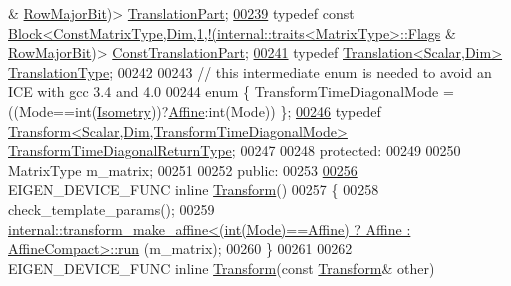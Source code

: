 \begin{DoxyCode}
       & \hyperlink{group__flags_gae4f56c2a60bbe4bd2e44c5b19cbe8762}{RowMajorBit})> \hyperlink{group___core___module_class_eigen_1_1_block}{TranslationPart};
\hyperlink{group___geometry___module_a3eab3259d3fac8106eb3139bc96ba852}{00239}   \textcolor{keyword}{typedef} \textcolor{keyword}{const} 
      \hyperlink{group___core___module_class_eigen_1_1_block}{Block<ConstMatrixType,Dim,1,!(internal::traits<MatrixType>::Flags}
       & \hyperlink{group__flags_gae4f56c2a60bbe4bd2e44c5b19cbe8762}{RowMajorBit})> \hyperlink{group___core___module_class_eigen_1_1_block}{ConstTranslationPart};
\hyperlink{group___geometry___module_a6b463d14d8be4c0eda2eed6e943b831f}{00241}   \textcolor{keyword}{typedef} \hyperlink{group___geometry___module_class_eigen_1_1_translation}{Translation<Scalar,Dim>} \hyperlink{group___geometry___module_a6b463d14d8be4c0eda2eed6e943b831f}{TranslationType};
00242   
00243   \textcolor{comment}{// this intermediate enum is needed to avoid an ICE with gcc 3.4 and 4.0}
00244   \textcolor{keyword}{enum} \{ TransformTimeDiagonalMode = ((Mode==int(\hyperlink{group__enums_ggaee59a86102f150923b0cac6d4ff05107a080cd5366173608f701cd945c2335568}{Isometry}))?\hyperlink{group__enums_ggaee59a86102f150923b0cac6d4ff05107a71e768e0581725d919d0b05f4cb83234}{Affine}:\textcolor{keywordtype}{int}(Mode)) \};
\hyperlink{group___geometry___module_a51af5e8d8d9d9bfec091ff8aa5b7845a}{00246}   \textcolor{keyword}{typedef} \hyperlink{group___geometry___module_class_eigen_1_1_transform}{Transform<Scalar,Dim,TransformTimeDiagonalMode>} 
      \hyperlink{group___geometry___module_a51af5e8d8d9d9bfec091ff8aa5b7845a}{TransformTimeDiagonalReturnType};
00247 
00248 \textcolor{keyword}{protected}:
00249 
00250   MatrixType m\_matrix;
00251 
00252 \textcolor{keyword}{public}:
00253 
\hyperlink{group___geometry___module_a79b94ccee0f7871610fa2fa084e0fd59}{00256}   EIGEN\_DEVICE\_FUNC \textcolor{keyword}{inline} \hyperlink{group___geometry___module_a79b94ccee0f7871610fa2fa084e0fd59}{Transform}()
00257   \{
00258     check\_template\_params();
00259     
      \hyperlink{struct_eigen_1_1internal_1_1transform__make__affine}{internal::transform\_make\_affine<(int(Mode)==Affine) ? Affine : AffineCompact>::run}
      (m\_matrix);
00260   \}
00261 
00262   EIGEN\_DEVICE\_FUNC \textcolor{keyword}{inline} \hyperlink{group___geometry___module_class_eigen_1_1_transform}{Transform}(\textcolor{keyword}{const} \hyperlink{group___geometry___module_class_eigen_1_1_transform}{Transform}& other)

\end{DoxyCode}
